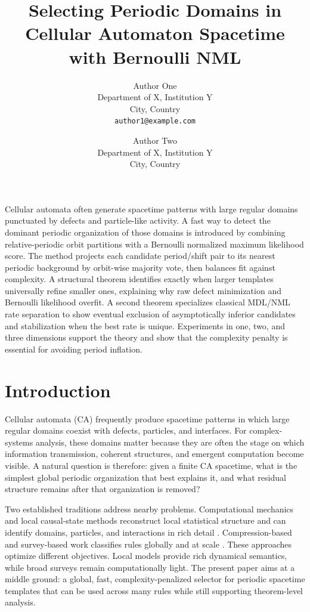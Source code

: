 \documentclass[10pt,twoside]{article}
\title{Selecting Periodic Domains in Cellular Automaton Spacetime with Bernoulli NML}
\author{Author One\\
Department of X, Institution Y\\
City, Country\\
\texttt{author1@example.com}\\[6pt]
\and
Author Two\\
Department of X, Institution Y\\
City, Country}
\begin{document}
\maketitle

\noindent Cellular automata often generate spacetime patterns with large regular domains punctuated by defects and particle-like activity. A fast way to detect the dominant periodic organization of those domains is introduced by combining relative-periodic orbit partitions with a Bernoulli normalized maximum likelihood score. The method projects each candidate period/shift pair to its nearest periodic background by orbit-wise majority vote, then balances fit against complexity. A structural theorem identifies exactly when larger templates universally refine smaller ones, explaining why raw defect minimization and Bernoulli likelihood overfit. A second theorem specializes classical MDL/NML rate separation to show eventual exclusion of asymptotically inferior candidates and stabilization when the best rate is unique. Experiments in one, two, and three dimensions support the theory and show that the complexity penalty is essential for avoiding period inflation.


\section{Introduction}

Cellular automata (CA) frequently produce spacetime patterns in which large regular domains coexist with defects, particles, and interfaces. For complex-systems analysis, these domains matter because they are often the stage on which information transmission, coherent structures, and emergent computation become visible. A natural question is therefore: given a finite CA spacetime, what is the simplest global periodic organization that best explains it, and what residual structure remains after that organization is removed?

Two established traditions address nearby problems. Computational mechanics and local causal-state methods reconstruct local statistical structure and can identify domains, particles, and interactions in rich detail \cite{crutchfield1997,hanson1992,rupe2018,shalizi2006}. Compression-based and survey-based work classifies rules globally and at scale \cite{packard1985,boccara1999,zenil2010}. These approaches optimize different objectives. Local models provide rich dynamical semantics, while broad surveys remain computationally light. The present paper aims at a middle ground: a global, fast, complexity-penalized selector for periodic spacetime templates that can be used across many rules while still supporting theorem-level analysis.
\end{document}

